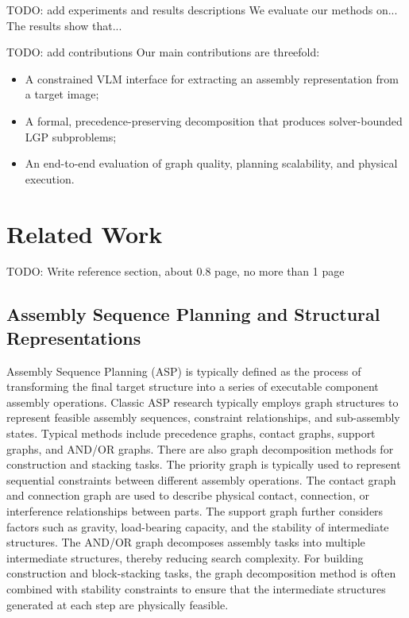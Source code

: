 \documentclass[journal]{IEEEtran}
\newcommand{\todo}[1]{{\color{red}TODO: #1}}
\begin{document}
\todo{add experiments and results descriptions} 
We evaluate our methods on... 
The results show that...

\todo{add contributions}
Our main contributions are threefold:
\begin{itemize}
    \item A constrained VLM interface for extracting an assembly representation from a target image;
    \item A formal, precedence-preserving decomposition that produces solver-bounded LGP subproblems;
    \item An end-to-end evaluation of graph quality, planning scalability, and physical execution.
\end{itemize}


\section{Related Work}

\todo{Write reference section, about 0.8 page, no more than 1 page}
\subsection{Assembly Sequence Planning and Structural Representations}

Assembly Sequence Planning (ASP) is typically defined as the process of transforming the final target structure into a series of executable component assembly operations.
Classic ASP research typically employs graph structures to represent feasible assembly sequences, constraint relationships, and sub-assembly states.
Typical methods include precedence graphs, contact graphs, support graphs, and AND/OR graphs.
There are also graph decomposition methods for construction and stacking tasks.
The priority graph is typically used to represent sequential constraints between different assembly operations.
The contact graph and connection graph are used to describe physical contact, connection, or interference relationships between parts.
The support graph further considers factors such as gravity, load-bearing capacity, and the stability of intermediate structures.
The AND/OR graph decomposes assembly tasks into multiple intermediate structures, thereby reducing search complexity.
For building construction and block-stacking tasks, the graph decomposition method is often combined with stability constraints to ensure that the intermediate structures generated at each step are physically feasible.
\end{document}
